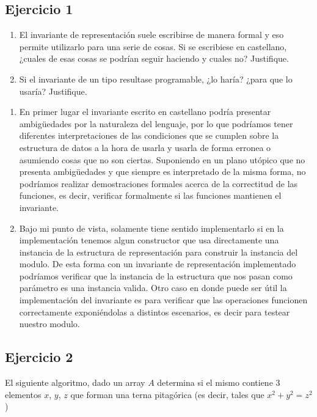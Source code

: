 \documentclass[10pt, a4paper]{article}
\begin{document}
\subsection*{Ejercicio 1}

\begin{enumerate}
 \item El invariante de representaci\'on suele escribirse de manera formal y eso permite utilizarlo para una serie de cosas. Si se escribiese en castellano, ¿cuales de esas cosas se podr\'ian seguir haciendo y cuales no? Justifique.
 \item Si el invariante de un tipo resultase programable, ¿lo har\'ia? ¿para que lo usar\'ia? Justifique.
\end{enumerate}

\begin{enumerate}
 \item En primer lugar el invariante escrito en castellano podr\'ia presentar ambigüedades por la naturaleza del lenguaje, por lo que podr\'iamos tener diferentes interpretaciones de las condiciones que se cumplen sobre la estructura de datos a la hora de usarla y usarla de forma erronea o asumiendo cosas que no son ciertas. Suponiendo en un plano ut\'opico que no presenta ambigüedades y que siempre es interpretado de la misma forma, no podr\'iamos realizar demostraciones formales acerca de la correctitud de las funciones, es decir, verificar formalmente si las funciones mantienen el invariante.
 
 \item Bajo mi punto de vista, solamente tiene sentido implementarlo si en la implementaci\'on tenemos algun constructor que usa directamente una instancia de la estructura de representaci\'on para construir la instancia del modulo. De esta forma con un invariante de representaci\'on implementado podr\'iamos verificar que la instancia de la estructura que nos pasan como par\'ametro es una instancia valida. Otro caso en donde puede ser \'util la implementaci\'on del invariante es para verificar que las operaciones funcionen correctamente exponi\'endolas a distintos escenarios, es decir para testear nuestro modulo.
\end{enumerate}



\subsection*{Ejercicio 2}
El siguiente algoritmo, dado un array $A$ determina si el mismo contiene $3$ elementos $x$, $y$, $z$ que forman una terna pitag\'orica (es decir, tales que $x^2 + y^2 = z^2$)
\end{document}
